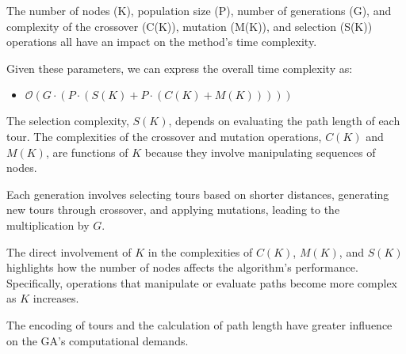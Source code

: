 \documentclass[preprint,authoryear]{elsarticle}
\begin{document}
{The number of nodes (K), population size (P), number of generations (G), and complexity of the crossover (C(K)), mutation (M(K)), and selection (S(K)) operations all have an impact on the method's time complexity.

Given these parameters, we can express the overall time complexity as:
\begin{itemize}
	\item $\mathcal{O}(G \cdot (P \cdot (S(K) + P \cdot (C(K) + M(K)))))$
\end{itemize}

The selection complexity, $S(K)$, depends on evaluating the path length of each tour.
The complexities of the crossover and mutation operations, $C(K)$ and $M(K)$, are functions of $K$ because they involve manipulating sequences of nodes.

Each generation involves selecting tours based on shorter distances, generating new tours through crossover, and applying mutations, leading to the multiplication by $G$.

The direct involvement of $K$ in the complexities of $C(K)$, $M(K)$, and $S(K)$ highlights how the number of nodes affects the algorithm's performance. Specifically, operations that manipulate or evaluate paths become more complex as $K$ increases.

The encoding of tours and the calculation of path length have greater influence on the GA's computational demands.

}
\end{document}
